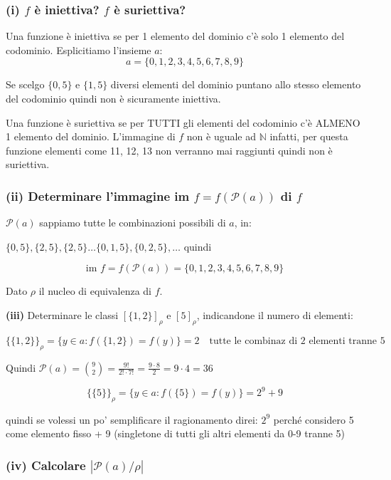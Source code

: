 \subsubsection*{(i) $f$ è iniettiva? $f$ è suriettiva?}

Una funzione è iniettiva se per 1 elemento del dominio c'è solo 1 elemento del codominio. Esplicitiamo l'insieme $a$:
$$a = \{0, 1, 2, 3, 4, 5, 6, 7, 8, 9\}$$

Se scelgo $\{0,5\}$ e $\{1,5\}$ diversi elementi del dominio puntano allo stesso elemento del codominio quindi non è sicuramente iniettiva.

Una funzione è suriettiva se per TUTTI gli elementi del codominio c'è ALMENO 1 elemento del dominio. L'immagine di $f$ non è uguale ad $\mathbb{N}$ infatti, per questa funzione elementi come 11, 12, 13 non verranno mai raggiunti quindi non è suriettiva.

\subsubsection*{(ii) Determinare l'immagine im $f = f(\mathcal{P}(a))$ di $f$}

$\mathcal{P}(a)$ sappiamo tutte le combinazioni possibili di $a$, in:

$\{0,5\}, \{2,5\}, \{2,5\} \dots \{0,1,5\}, \{0,2,5\}, \dots$ quindi

$$\text{im } f = f(\mathcal{P}(a)) = \{0, 1, 2, 3, 4, 5, 6, 7, 8, 9\}$$

Dato $\rho$ il nucleo di equivalenza di $f$.

\textbf{(iii)} Determinare le classi $[\{1,2\}]_\rho$ e $[5]_\rho$, indicandone il numero di elementi:

$$\{\{1,2\}\}_\rho = \{y \in a : f(\{1,2\}) = f(y)\} = 2 \quad \text{tutte le combinaz di 2 elementi tranne 5}$$

Quindi $\mathcal{P}(a) = \binom{9}{2} = \frac{9!}{2! \cdot 7!} = \frac{9 \cdot 8}{2} = 9 \cdot 4 = 36$

$$\{\{5\}\}_\rho = \{y \in a : f(\{5\}) = f(y)\} = 2^9 + 9$$

quindi se volessi un po' semplificare il ragionamento direi: $2^9$ perché considero 5 come elemento fisso + 9 (singletone di tutti gli altri elementi da 0-9 tranne 5)

\subsubsection*{(iv) Calcolare $|\mathcal{P}(a)/\rho|$}

